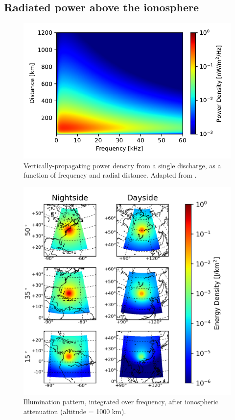 \subsection{Radiated power above the ionosphere}

\begin{figure}
\begin{center}
\includegraphics{figures/power_scaling_below_ionosphere.pdf}
\caption[Illumination pattern below the ionosphere]{Vertically-propagating power density from a single discharge, as a function of frequency and radial distance. Adapted from \cite{Marshall2011}.}
\label{fig:illumination}
\end{center}
\end{figure}


\begin{figure}
\begin{center}
\includegraphics{figures/illumination_basemap.png}
\caption[Illumination pattern above the ionosphere]{Illumination pattern, integrated over frequency, after ionospheric attenuation (altitude = 1000 km).}
\label{fig:illumination}
\end{center}
\end{figure}

